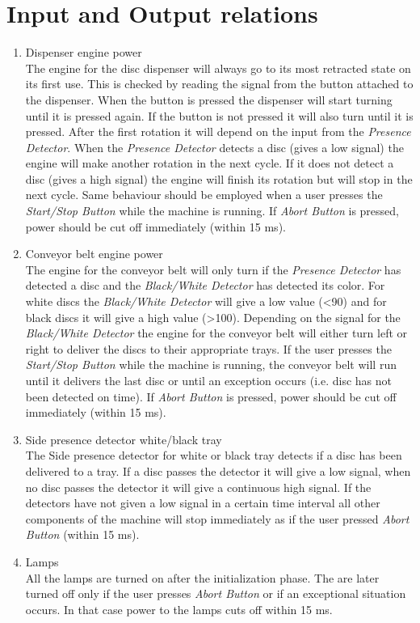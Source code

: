 \documentclass[a4paper,oneside,11pt]{report}
\begin{document}
\section{Input and Output relations}
\begin{enumerate}
\item Dispenser engine power\\
    The engine for the disc dispenser will always go to its most retracted state on its first use. This is checked by reading the signal from the button attached to the dispenser. When the button is pressed the dispenser will start turning until it is pressed again. If the button is not pressed it will also turn until it is pressed. After the first rotation it will depend on the input from the \emph{Presence Detector}. When the \emph{Presence Detector} detects a disc (gives a low signal) the engine will make another rotation in the next cycle. If it does not detect a disc (gives a high signal) the engine will finish its rotation but will stop in the next cycle. Same behaviour should be employed when a user presses the \emph{Start/Stop Button} while the machine is running. If \emph{Abort Button} is pressed, power should be cut off immediately (within 15 ms).
\item Conveyor belt engine power\\
    The engine for the conveyor belt will only turn if the \emph{Presence Detector} has detected a disc and the \emph{Black/White Detector} has detected its color. For white discs the \emph{Black/White Detector} will give a low value (\textless 90) and for black discs it will give a high value (\textgreater 100). Depending on the signal for the \emph{Black/White Detector} the engine for the conveyor belt will either turn left or right to deliver the discs to their appropriate trays. If the user presses the \emph{Start/Stop Button} while the machine is running, the conveyor belt will run until it delivers the last disc or until an exception occurs (i.e. disc has not been detected on time). If \emph{Abort Button} is pressed, power should be cut off immediately (within 15 ms).
\item Side presence detector white/black tray\\
    The Side presence detector for white or black tray detects if a disc has been delivered to a tray. If a disc passes the detector it will give a low signal, when no disc passes the detector it will give a continuous high signal. If the detectors have not given a low signal in a certain time interval all other components of the machine will stop immediately as if the user pressed \emph{Abort Button} (within 15 ms).
\item Lamps\\
    All the lamps are turned on after the initialization phase. The are later turned off only if the user presses \emph{Abort Button} or if an exceptional situation occurs. In that case power to the lamps cuts off within 15 ms.
\end{enumerate}
\end{document}
